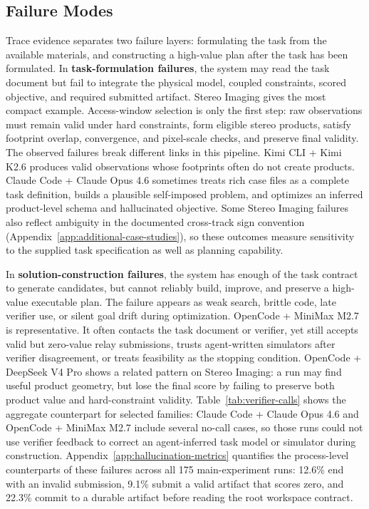 \documentclass[11pt]{article}
\begin{document}
\subsection{Failure Modes}
\label{sec:what-fails}

Trace evidence separates two failure layers: formulating the task from the available materials, and constructing a high-value plan after the task has been formulated. In \textbf{task-formulation failures}, the system may read the task document but fail to integrate the physical model, coupled constraints, scored objective, and required submitted artifact. Stereo Imaging gives the most compact example. Access-window selection is only the first step: raw observations must remain valid under hard constraints, form eligible stereo products, satisfy footprint overlap, convergence, and pixel-scale checks, and preserve final validity. The observed failures break different links in this pipeline. Kimi CLI + Kimi K2.6 produces valid observations whose footprints often do not create products. Claude Code + Claude Opus 4.6 sometimes treats rich case files as a complete task definition, builds a plausible self-imposed problem, and optimizes an inferred product-level schema and hallucinated objective. Some Stereo Imaging failures also reflect ambiguity in the documented cross-track sign convention (Appendix~\ref{app:additional-case-studies}), so these outcomes measure sensitivity to the supplied task specification as well as planning capability.

In \textbf{solution-construction failures}, the system has enough of the task contract to generate candidates, but cannot reliably build, improve, and preserve a high-value executable plan. The failure appears as weak search, brittle code, late verifier use, or silent goal drift during optimization. OpenCode + MiniMax M2.7 is representative. It often contacts the task document or verifier, yet still accepts valid but zero-value relay submissions, trusts agent-written simulators after verifier disagreement, or treats feasibility as the stopping condition. OpenCode + DeepSeek V4 Pro shows a related pattern on Stereo Imaging: a run may find useful product geometry, but lose the final score by failing to preserve both product value and hard-constraint validity. Table~\ref{tab:verifier-calls} shows the aggregate counterpart for selected families: Claude Code + Claude Opus 4.6 and OpenCode + MiniMax M2.7 include several no-call cases, so those runs could not use verifier feedback to correct an agent-inferred task model or simulator during construction. Appendix~\ref{app:hallucination-metrics} quantifies the process-level counterparts of these failures across all 175 main-experiment runs: 12.6\% end with an invalid submission, 9.1\% submit a valid artifact that scores zero, and 22.3\% commit to a durable artifact before reading the root workspace contract.
\end{document}
